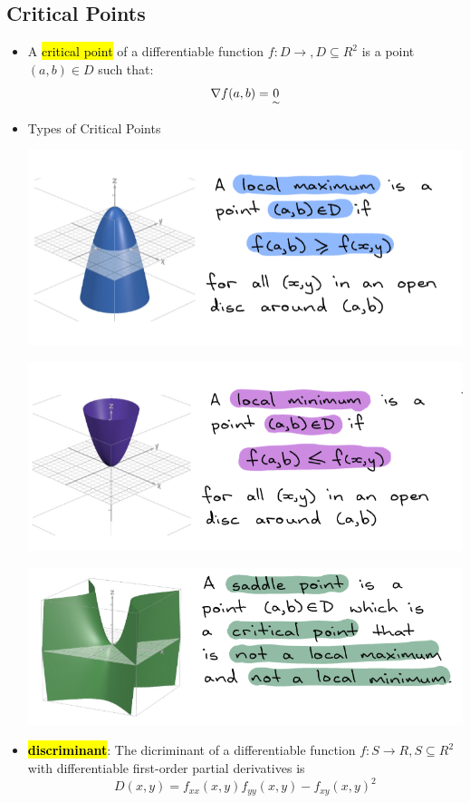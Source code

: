 \documentclass{article}
\begin{document}
  \subsection*{Critical Points}
    \begin{itemize}
      \item A \hl{critical point} of a differentiable function $f: D \rightarrow, D \subseteq R^2$ is a point $(a,b) \in D$ such that:
      $$
        \nabla f(a,b) = \underset{\sim}{0}
      $$

      \item Types of Critical Points

      \includegraphics[width=\linewidth]{Graphs/w10_3.png}

      \includegraphics[width=\linewidth]{Graphs/w10_4.png}

      \includegraphics[width=\linewidth]{Graphs/w10_7.png}

      \item \hl{\textbf{discriminant}}: The dicriminant of a differentiable function $f: S \rightarrow R, S \subseteq R^2$ with differentiable first-order partial derivatives is 
      $$
        D(x,y) =f_{xx}(x,y)f_{yy}(x,y) - f_{xy}(x,y)^2
      $$


\end{itemize}
\end{document}
